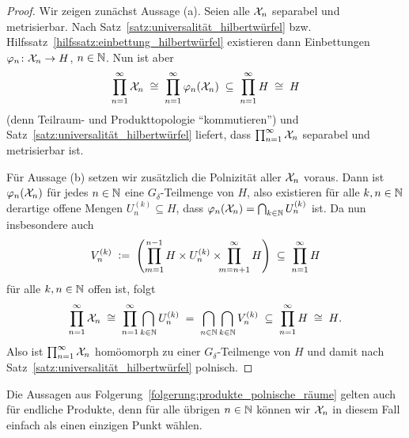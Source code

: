 \documentclass[../thesis/thesis.tex]{subfiles}
\begin{document}
	\begin{proof}
		Wir zeigen zunächst Aussage (a). Seien alle $\mathcal{X}_n$ separabel und metrisierbar. Nach Satz~\ref{satz:universalität_hilbertwürfel} bzw. 
		Hilfssatz~\ref{hilfssatz:einbettung_hilbertwürfel} existieren dann Einbettungen $\varphi_n \colon \mathcal{X}_n \to H$, $n \in \mathbb{N}$. Nun ist aber 
		\[ \prod_{n=1}^{\infty} \mathcal{X}_n \; \cong \; \prod_{n=1}^{\infty} \varphi_n(\mathcal{X}_n) \; \subseteq \; \prod_{n=1}^{\infty} H \; \cong \; H \]
		(denn Teilraum- und Produkttopologie \enquote{kommutieren}) und Satz~\ref{satz:universalität_hilbertwürfel} liefert, dass $\prod_{n=1}^{\infty} \mathcal{X}_n$ separabel und metrisierbar ist.
		
		Für Aussage (b) setzen wir zusätzlich die Polnizität aller $\mathcal{X}_n$ voraus. Dann ist $\varphi_n(\mathcal{X}_n)$ für jedes $n \in \mathbb{N}$ eine $G_{\delta}$-Teilmenge von $H$, also
		existieren für alle $k, n \in \mathbb{N}$ derartige offene Mengen $U_n^{(k)} \subseteq H$, dass $\varphi_n(\mathcal{X}_n) = \bigcap_{k \in \mathbb{N}} U_n^{(k)}$ ist. Da nun insbesondere auch
		\[ V_n^{(k)} \; \vcentcolon = \; \left( \prod_{m=1}^{n-1} H \times U_n^{(k)} \times \!\!\! \prod_{m=n+1}^{\infty} H \right) \; \subseteq \; \prod_{n=1}^{\infty} H \]
		für alle $k, n \in \mathbb{N}$ offen ist, folgt
		\[ \prod_{n=1}^{\infty} \mathcal{X}_n \; \cong \; \prod_{n=1}^{\infty} \bigcap_{k \in \mathbb{N}} U_n^{(k)} \; = \; \bigcap_{n \in \mathbb{N}} \bigcap_{k \in \mathbb{N}} V_n^{(k)} \; \subseteq \; \prod_{n=1}^{\infty} H \; \cong \; H \text{.} \]
		Also ist $\prod_{n=1}^{\infty} \mathcal{X}_n$ homöomorph zu einer $G_{\delta}$-Teilmenge von $H$ und damit nach Satz~\ref{satz:universalität_hilbertwürfel} polnisch.
	\end{proof}
	
	\begin{Bemerkung}
		Die Aussagen aus Folgerung~\ref{folgerung:produkte_polnische_räume} gelten auch für endliche Produkte, denn für alle übrigen $n \in \mathbb{N}$ können wir $\mathcal{X}_n$ in diesem Fall einfach als einen einzigen Punkt wählen.
	\end{Bemerkung}
	
\end{document}
